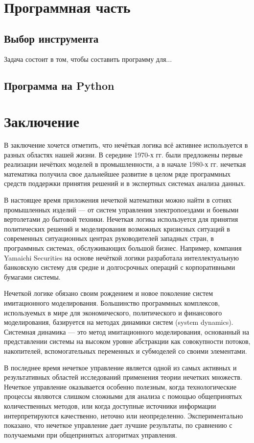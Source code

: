 \documentclass[a4paper,12pt]{report}
\begin{document}
\chapter{Программная часть}
\section{Выбор инструмента}
Задача состоит в том, чтобы составить программу для...
\section{Программа на Python}



\chapter{Заключение}
В заключение хочется отметить, что нечёткая логика всё активнее используется в разных областях нашей жизни. В середине 1970-х гг. были предложены первые реализации нечётких моделей в промышленности, а в начале 1980-х гг. нечеткая математика получила свое дальнейшее развитие в целом ряде программных средств поддержки принятия решений и в экспертных системах анализа данных.

В настоящее время приложения нечеткой математики можно найти в сотнях промышленных изделий — от систем управления электропоездами и боевыми вертолетами до бытовой техники. Нечеткая логика используется для принятия политических решений и моделирования возможных кризисных ситуаций в современных ситуационных центрах руководителей западных стран, в программных системах, обслуживающих большой бизнес. Например, компания Yamaichi Securities на основе нечёткой логики разработала интеллектуальную банковскую систему для средне и долгосрочных операций с корпоративными бумагами системы.

Нечеткой логике обязано своим рождением и новое поколение систем имитационного моделирования. Большинство программных комплексов, используемых в мире для экономического, политического и финансового моделирования, базируется на методах динамики систем (system dynamics). Системная динамика — это метод имитационного моделирования, основанный на представлении системы на высоком уровне абстракции как совокупности потоков, накопителей, вспомогательных переменных и субмоделей со своими элементами.

В последнее время нечеткое управление является одной из самых активных и результативных областей исследований применения теории нечетких множеств. Нечеткое управление оказывается особенно полезным, когда технологические процессы являются слишком сложными для анализа с помощью общепринятых количественных методов, или когда доступные источники информации интерпретируются качественно, неточно или неопределенно. Экспериментально показано, что нечеткое управление дает лучшие результаты, по сравнению с получаемыми при общепринятых алгоритмах управления.
\end{document}
